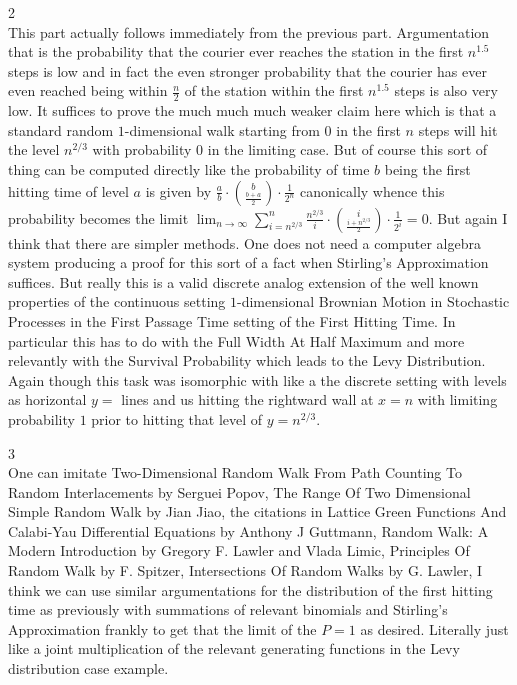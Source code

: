 2 \\
This part actually follows immediately from the previous part. Argumentation that is the probability that the courier ever reaches the station in the first $n^{1.5}$ steps is low and in fact the even stronger probability that the courier has ever even reached being within $\frac{n}{2}$ of the station within the first $n^{1.5}$ steps is also very low. It suffices to prove the much much much weaker claim here which is that a standard random $1$-dimensional walk starting from $0$ in the first $n$ steps will hit the level $n^{2/3}$ with probability $0$ in the limiting case. But of course this sort of thing can be computed directly like the probability of time $b$ being the first hitting time of level $a$ is given by $\frac{a}{b} \cdot \binom{b}{\frac{b+a}{2}} \cdot \frac{1}{2^n}$ canonically whence this probability becomes the limit $\lim_{n \to \infty} \sum_{i=n^{2/3}}^n \frac{n^{2/3}}{i} \cdot \binom{i}{\frac{i+n^{2/3}}{2}} \cdot \frac{1}{2^i} = 0$. But again I think that there are simpler methods. One does not need a computer algebra system producing a proof for this sort of a fact when Stirling's Approximation suffices. But really this is a valid discrete analog extension of the well known properties of the continuous setting $1$-dimensional Brownian Motion in Stochastic Processes in the First Passage Time setting of the First Hitting Time. In particular this has to do with the Full Width At Half Maximum and more relevantly with the Survival Probability which leads to the Levy Distribution. Again though this task was isomorphic with like a the discrete setting with levels as horizontal $y=$ lines and us hitting the rightward wall at $x=n$ with limiting probability $1$ prior to hitting that level of $y=n^{2/3}$.

3 \\
One can imitate Two-Dimensional Random Walk From Path Counting To Random Interlacements by Serguei Popov, The Range Of Two Dimensional Simple Random Walk by Jian Jiao, the citations in Lattice Green Functions And Calabi-Yau Differential Equations by Anthony J Guttmann, Random Walk: A Modern Introduction by Gregory F. Lawler and Vlada Limic, Principles Of Random Walk by F. Spitzer, Intersections Of Random Walks by G. Lawler, I think we can use similar argumentations for the distribution of the first hitting time as previously with summations of relevant binomials and Stirling's Approximation frankly to get that the limit of the $P = 1$ as desired. Literally just like a joint multiplication of the relevant generating functions in the Levy distribution case example.


